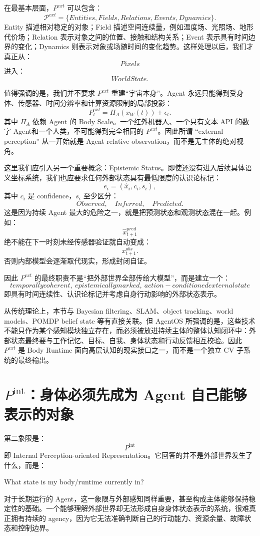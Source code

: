 在最基本层面，$P^{ext}$ 可以包含：
\[
\mathcal P^{ext}
=
\{
Entities,
Fields,
Relations,
Events,
Dynamics
\}.
\]
Entity 描述相对稳定的对象；Field 描述空间连续量，例如温度场、光照场、地形代价场；Relation 表示对象之间的位置、接触和结构关系；Event 表示具有时间边界的变化；Dynamics 则表示对象或场随时间的变化趋势。这样处理以后，我们才真正从：
\[
Pixels
\]
进入：
\[
WorldState.
\]

值得强调的是，我们并不要求 $P^{ext}$ 重建``宇宙本身''。Agent 永远只能得到受身体、传感器、时间分辨率和计算资源限制的局部投影：
\[
P_t^{ext}
=
\Pi_A(
x_W(t)
)
+
\epsilon_t.
\]
其中 $\Pi_A$ 依赖 Agent 的 Body Scale。一个红外机器人、一个只有文本 API 的数字 Agent和一个人类，不可能得到完全相同的 $P^{ext}$。因此所谓 ``external perception'' 从一开始就是 Agent-relative observation，而不是无主体的绝对视角。

这里我们应引入另一个重要概念：Epistemic Status。即使还没有进入后续具体语义坐标系统，我们也应要求任何外部状态具有最低限度的认识论标记：
\[
e_i
=
(
\hat{x}_i,
c_i,
s_i
),
\]
其中 $c_i$ 是 confidence，$s_i$ 至少区分：
\[
Observed,\quad Inferred,\quad Predicted.
\]
这是因为持续 Agent 最大的危险之一，就是把预测状态和观测状态混在一起。例如：
\[
\hat{x}_{t+1}^{pred}
\]
绝不能在下一时刻未经传感器验证就自动变成：
\[
x_{t+1}^{obs}.
\]
否则内部模型会逐渐取代现实，形成封闭自证。

因此 $P^{ext}$ 的最终职责不是``把外部世界全部传给大模型''，而是建立一个：
\[
\boxed{
temporally coherent,\ epistemically marked,\ action-conditioned external state
}
\]
即具有时间连续性、认识论标记并考虑自身行动影响的外部状态表示。

从传统理论上，本节与 Bayesian filtering、SLAM、object tracking、world models、POMDP belief state 等有直接关联。但 AgentOS 所强调的是，这些技术不能只作为某个感知模块独立存在，而必须被放进持续主体的整体认知闭环中：外部状态最终要与工作记忆、目标、自我、身体状态和行动反馈相互校验。因此 $P^{ext}$ 是 Body Runtime 面向高层认知的现实接口之一，而不是一个独立 CV 子系统的最终输出。

\section{$P^{\mathrm{int}}$：身体必须先成为 Agent 自己能够表示的对象}
\label{sec:internal-perception}

第二象限是：
\[
\boxed{
P^{\mathrm{int}}
}
\]
即 Internal Perception-oriented Representation。它回答的并不是外部世界发生了什么，而是：
\begin{statementbox}
What state is my body/runtime currently in?
\end{statementbox}
对于长期运行的 Agent，这一象限与外部感知同样重要，甚至构成主体能够保持稳定性的基础。一个能够理解外部世界却无法形成自身身体状态表示的系统，很难真正拥有持续的 agency，因为它无法准确判断自己的行动能力、资源余量、故障状态和控制边界。

